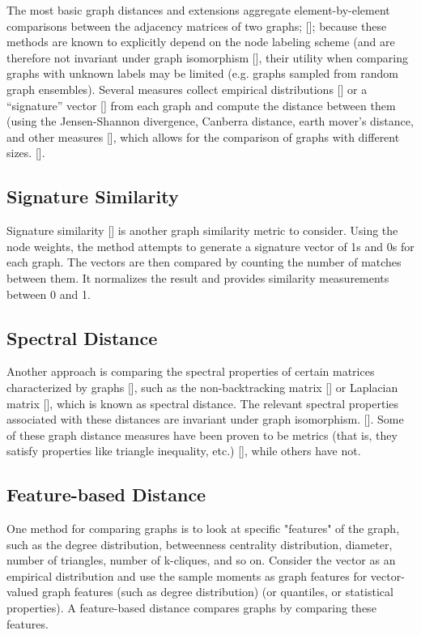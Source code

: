 The most basic graph distances and extensions aggregate element-by-element comparisons between the adjacency matrices of two graphs; [\cite{Golub:2013, Jaccard:1901, Hamming:1950, Gao:2010, Wallis:2001}]; because these methods are known to explicitly depend on the node labeling scheme (and are therefore not invariant under graph isomorphism [\cite{Chowdhury:2017}], their utility when comparing graphs with unknown labels  may be limited (e.g. graphs sampled from random graph ensembles). Several measures collect empirical distributions [\cite{Carpi:2011}] or a “signature” vector [\cite{Berlingerio:2012}] from each graph and compute the distance between them (using the Jensen-Shannon divergence, Canberra distance, earth mover’s distance, and other measures [\cite{Emmert-Streib:2016}], which allows for the comparison of graphs with different sizes. [\cite{Bagrow:2019}].

\subsection{Signature Similarity}
Signature similarity [\cite{Papadimitriou:2010}] is another graph similarity metric to consider. Using the node weights, the method attempts to generate a signature vector of 1s and 0s for each graph. The vectors are then compared by counting the number of matches between them. It normalizes the result and provides similarity measurements between 0 and 1.

\subsection{Spectral Distance}
Another approach is comparing the spectral properties of certain matrices characterized by graphs [\cite{Jurman:2015}], such as the non-backtracking matrix [\cite{Torres:2019, Mellor:2019}] or Laplacian matrix [\cite{Jurman:2011}], which is known as spectral distance. The relevant spectral properties associated with these distances are invariant under graph isomorphism. [\cite{Chowdhury:2017, vanSteen:2010}]. Some of these graph distance measures have been proven to be metrics (that is, they satisfy properties like triangle inequality, etc.) [\cite{Deza:2009}], while others have not.

\subsection{Feature-based Distance}
One method for comparing graphs is to look at specific "features" of the graph, such as the degree distribution, betweenness centrality distribution, diameter, number of triangles, number of k-cliques, and so on. Consider the vector as an empirical distribution and use the sample moments as graph features for vector-valued graph features (such as degree distribution) (or quantiles, or statistical properties). A feature-based distance compares graphs by comparing these features.

